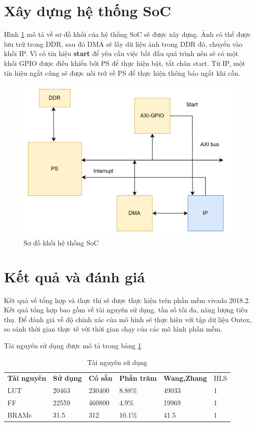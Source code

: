 \section{Xây dựng hệ thống SoC}
Hình \ref{fig:soc1} mô tả về sơ đồ khối của hệ thống SoC sẽ được xây dựng. Ảnh có thể được lưu trữ trong DDR, sau đó DMA sẽ lấy dữ liệu ảnh trong DDR đó, chuyển vào khối IP. Vì có tín hiệu \textbf{start} để yêu cầu việc bắt đầu quá trình nên sẽ có một khối GPIO được điều khiển bởi PS để thực hiện bật, tắt chân start. Từ IP, một tín hiệu ngắt cũng sẽ được nối trở về PS để thực hiện thông báo ngắt khi cần. 
\begin{figure}[!ht]
	\centering
	\includegraphics[width=0.6\linewidth]{figures/soc1.png}
	\caption{Sơ đồ khối hệ thống SoC}
	\label{fig:soc1}
\end{figure}
\section{Kết quả và đánh giá}
Kết quả về tổng hợp và thực thi sẽ được thực hiện trên phần mềm vivado 2018.2. Kết quả tổng hợp bao gồm về tài nguyên sử dụng, tần số tối đa, năng lượng tiêu thụ. Để đánh giá về độ chính xác của mô hình sẽ thực hiện với tập dữ liệu Outex, so sánh thời gian thực tế với thời gian chạy của các mô hình phần mềm.

Tài nguyên sử dụng được mô tả trong bảng \ref{tab:resoruce}

\begin{table}[H]
	\centering
	\renewcommand{\arraystretch}{1.3}
	\begin{tabular}{|p{2cm} p{2cm} p{2cm} p{2cm} p{4cm } p{2cm}|}
		\hline
		\rowcolor{gray!30}
		\textbf{Tài nguyên} & \textbf{Sử dụng}  & \textbf{Có sẵn} & \textbf{Phần trăm} &  \textbf{Wang,Zhang \cite{realTimeTexture}} & HLS  \\
		LUT & 20463 & 230400 & 8.88\% & 49033 & 1
		\\ \hline
		FF & 22559 & 460800 & 4.9\% & 19969 & 1
		\\ \hline
		BRAMs & 31.5 & 312 & 10.1\% & 41.5 & 1
		\\ \hline
	\end{tabular}
	\caption{Tài nguyên sử dụng}
	\label{tab:resoruce}
\end{table}


